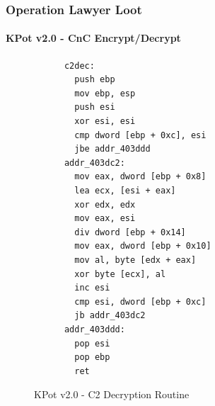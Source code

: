 \documentclass[aspectratio=169]{beamer}
\begin{document}
{
  \begin{frame}[fragile]{}
    \frametitle{Operation Lawyer Loot}
    \framesubtitle{KPot v2.0 - CnC Encrypt/Decrypt}
    \begin{figure}[hp]
      \begin{tcolorbox}[title=KPot v2.0 - CnC Encrypt/Decrypt Routine,colback=black]
     \begin{verbatim}
      c2dec:
        push ebp
        mov ebp, esp
        push esi
        xor esi, esi
        cmp dword [ebp + 0xc], esi
        jbe addr_403ddd
      addr_403dc2:
        mov eax, dword [ebp + 0x8]
        lea ecx, [esi + eax]
        xor edx, edx
        mov eax, esi
        div dword [ebp + 0x14]
        mov eax, dword [ebp + 0x10]
        mov al, byte [edx + eax]
        xor byte [ecx], al
        inc esi
        cmp esi, dword [ebp + 0xc]
        jb addr_403dc2
      addr_403ddd:
        pop esi
        pop ebp
        ret
    \end{verbatim}
  \end{tcolorbox}
  \caption{KPot v2.0 - C2 Decryption Routine}
\end{figure}
\end{frame}
}
\end{document}
